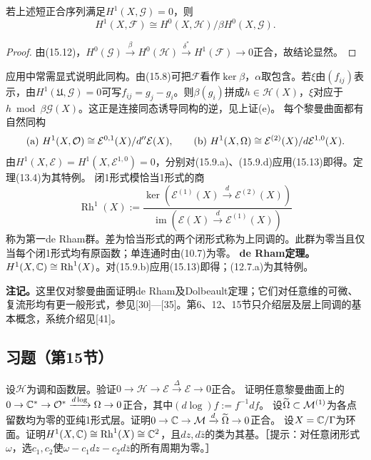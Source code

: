 若上述短正合序列满足$H^1(X,\mathcal G)=0$，则
\[
H^1(X,\mathcal F)\cong H^0(X,\mathcal H)/\beta H^0(X,\mathcal G).
\]
\begin{proof}由(15.12)，$H^0(\mathcal G)\xrightarrow\beta H^0(\mathcal H)\xrightarrow{\delta^*}H^1(\mathcal F)\to0$正合，故结论显然。\end{proof}
应用中常需显式说明此同构。由(15.8)可把$\mathcal F$看作$\ker\beta$，$\alpha$取包含。若$\xi$由$(f_{ij})$表示，由$H^1(\mathfrak U,\mathcal G)=0$可写$f_{ij}=g_j-g_i$。则$\beta(g_i)$拼成$h\in\mathcal H(X)$，$\xi$对应于$h\bmod\beta\mathcal G(X)$。这正是连接同态诱导同构的逆，见上证(e)。
每个黎曼曲面都有自然同构
\[
\text{(a) }H^1(X,\mathcal O)\cong\mathcal E^{0,1}(X)/d''\mathcal E(X),\qquad
\text{(b) }H^1(X,\Omega)\cong\mathcal E^{(2)}(X)/d\mathcal E^{1,0}(X).
\]
由$H^1(X,\mathcal E)=H^1(X,\mathcal E^{1,0})=0$，分别对(15.9.a)、(15.9.d)应用(15.13)即得。定理(13.4)为其特例。
闭1形式模恰当1形式的商
\[
\operatorname{Rh}^1(X):=\frac{\ker(\mathcal E^{(1)}(X)\xrightarrow d\mathcal E^{(2)}(X))}{\operatorname{im}(\mathcal E(X)\xrightarrow d\mathcal E^{(1)}(X))}
\]
称为第一de Rham群。差为恰当形式的两个闭形式称为上同调的。此群为零当且仅当每个闭1形式均有原函数；单连通时由(10.7)为零。
\textbf{de Rham定理。}$H^1(X,\mathbb C)\cong\operatorname{Rh}^1(X)$。对(15.9.b)应用(15.13)即得；(12.7.a)为其特例。

\textbf{注记。}这里仅对黎曼曲面证明de Rham及Dolbeault定理；它们对任意维的可微、复流形均有更一般形式，参见[30]—[35]。第6、12、15节只介绍层及层上同调的基本概念，系统介绍见[41]。
\subsection*{习题（第15节）}
设$\mathcal H$为调和函数层。验证$0\to\mathcal H\to\mathcal E\xrightarrow\Delta\mathcal E\to0$正合。
证明任意黎曼曲面上的$0\to\mathbb C^*\to\mathcal O^*\xrightarrow{d\log}\Omega\to0$正合，其中$(d\log)f:=f^{-1}df$。
设$\widetilde\Omega\subset\mathcal M^{(1)}$为各点留数均为零的亚纯1形式层。证明$0\to\mathbb C\to\mathcal M\xrightarrow d\widetilde\Omega\to0$正合。
设$X=\mathbb C/\Gamma$为环面。证明$H^1(X,\mathbb C)\cong\operatorname{Rh}^1(X)\cong\mathbb C^2$，且$dz,d\bar z$的类为其基。［提示：对任意闭形式$\omega$，选$c_1,c_2$使$\omega-c_1dz-c_2d\bar z$的所有周期为零。］
